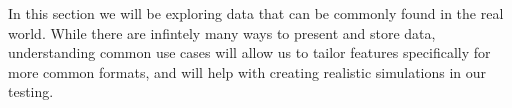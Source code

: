 In this section we will be exploring data that can be commonly found in the real world.
While there are infintely many ways to present and store data, understanding common use cases will allow us to tailor
features specifically for more common formats, and will help with creating realistic simulations in our testing.